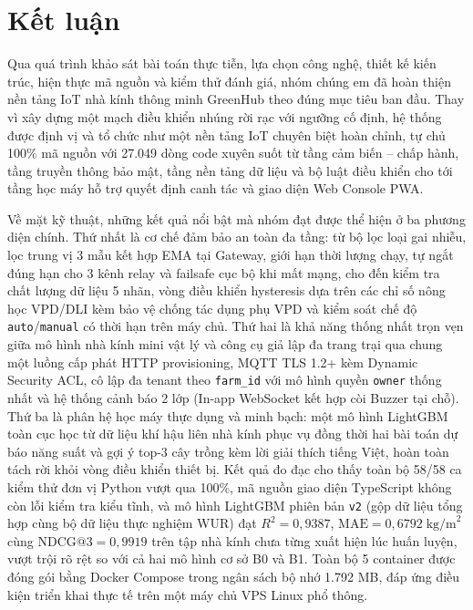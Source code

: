 \chapter*{Kết luận}

Qua quá trình khảo sát bài toán thực tiễn, lựa chọn công nghệ, thiết kế kiến trúc, hiện thực mã nguồn và kiểm thử đánh giá, nhóm chúng em đã hoàn thiện nền tảng IoT nhà kính thông minh GreenHub theo đúng mục tiêu ban đầu. Thay vì xây dựng một mạch điều khiển nhúng rời rạc với ngưỡng cố định, hệ thống được định vị và tổ chức như một nền tảng IoT chuyên biệt hoàn chỉnh, tự chủ 100\% mã nguồn với 27.049 dòng code xuyên suốt từ tầng cảm biến -- chấp hành, tầng truyền thông bảo mật, tầng nền tảng dữ liệu và bộ luật điều khiển cho tới tầng học máy hỗ trợ quyết định canh tác và giao diện Web Console PWA.

Về mặt kỹ thuật, những kết quả nổi bật mà nhóm đạt được thể hiện ở ba phương diện chính. Thứ nhất là cơ chế đảm bảo an toàn đa tầng: từ bộ lọc loại gai nhiễu, lọc trung vị 3 mẫu kết hợp EMA tại Gateway, giới hạn thời lượng chạy, tự ngắt đúng hạn cho 3 kênh relay và failsafe cục bộ khi mất mạng, cho đến kiểm tra chất lượng dữ liệu 5 nhãn, vòng điều khiển hysteresis dựa trên các chỉ số nông học VPD/DLI kèm bảo vệ chống tác dụng phụ VPD và kiểm soát chế độ \texttt{auto}/\texttt{manual} có thời hạn trên máy chủ. Thứ hai là khả năng thống nhất trọn vẹn giữa mô hình nhà kính mini vật lý và công cụ giả lập đa trang trại qua chung một luồng cấp phát HTTP provisioning, MQTT TLS 1.2+ kèm Dynamic Security ACL, cô lập đa tenant theo \texttt{farm\_id} với mô hình quyền \texttt{owner} thống nhất và hệ thống cảnh báo 2 lớp (In-app WebSocket kết hợp còi Buzzer tại chỗ). Thứ ba là phân hệ học máy thực dụng và minh bạch: một mô hình LightGBM toàn cục học từ dữ liệu khí hậu liên nhà kính phục vụ đồng thời hai bài toán dự báo năng suất và gợi ý top-3 cây trồng kèm lời giải thích tiếng Việt, hoàn toàn tách rời khỏi vòng điều khiển thiết bị. Kết quả đo đạc cho thấy toàn bộ 58/58 ca kiểm thử đơn vị Python vượt qua 100\%, mã nguồn giao diện TypeScript không còn lỗi kiểm tra kiểu tĩnh, và mô hình LightGBM phiên bản \texttt{v2} (gộp dữ liệu tổng hợp cùng bộ dữ liệu thực nghiệm WUR) đạt \(R^2 = 0,9387\), \(\text{MAE} = 0,6792\;\text{kg/m}^2\) cùng \(\text{NDCG@3} = 0,9919\) trên tập nhà kính chưa từng xuất hiện lúc huấn luyện, vượt trội rõ rệt so với cả hai mô hình cơ sở B0 và B1. Toàn bộ 5 container được đóng gói bằng Docker Compose trong ngân sách bộ nhớ 1.792 MB, đáp ứng điều kiện triển khai thực tế trên một máy chủ VPS Linux phổ thông.

